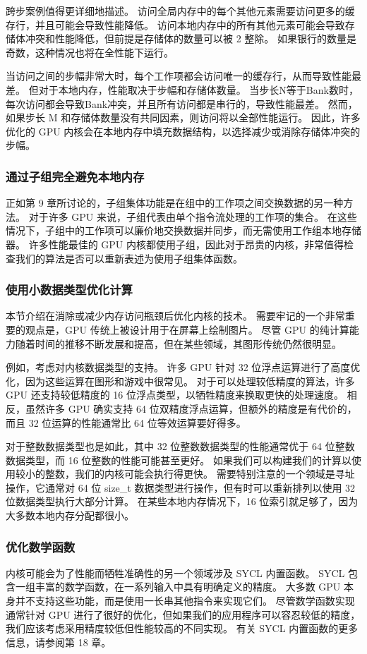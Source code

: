 跨步案例值得更详细地描述。 访问全局内存中的每个其他元素需要访问更多的缓存行，并且可能会导致性能降低。 访问本地内存中的所有其他元素可能会导致存储体冲突和性能降低，但前提是存储体的数量可以被 2 整除。 如果银行的数量是奇数，这种情况也将在全性能下运行。

当访问之间的步幅非常大时，每个工作项都会访问唯一的缓存行，从而导致性能最差。 但对于本地内存，性能取决于步幅和存储体数量。 当步长N等于Bank数时，每次访问都会导致Bank冲突，并且所有访问都是串行的，导致性能最差。 然而，如果步长 M 和存储体数量没有共同因素，则访问将以全部性能运行。 因此，许多优化的 GPU 内核会在本地内存中填充数据结构，以选择减少或消除存储体冲突的步幅。

\subsubsection{通过子组完全避免本地内存}
正如第 9 章所讨论的，子组集体功能是在组中的工作项之间交换数据的另一种方法。 对于许多 GPU 来说，子组代表由单个指令流处理的工作项的集合。 在这些情况下，子组中的工作项可以廉价地交换数据并同步，而无需使用工作组本地存储器。 许多性能最佳的 GPU 内核都使用子组，因此对于昂贵的内核，非常值得检查我们的算法是否可以重新表述为使用子组集体函数。

\subsubsection{使用小数据类型优化计算}
本节介绍在消除或减少内存访问瓶颈后优化内核的技术。 需要牢记的一个非常重要的观点是，GPU 传统上被设计用于在屏幕上绘制图片。 尽管 GPU 的纯计算能力随着时间的推移不断发展和提高，但在某些领域，其图形传统仍然很明显。

例如，考虑对内核数据类型的支持。 许多 GPU 针对 32 位浮点运算进行了高度优化，因为这些运算在图形和游戏中很常见。 对于可以处理较低精度的算法，许多 GPU 还支持较低精度的 16 位浮点类型，以牺牲精度来换取更快的处理速度。 相反，虽然许多 GPU 确实支持 64 位双精度浮点运算，但额外的精度是有代价的，而且 32 位运算的性能通常比 64 位等效运算要好得多。

对于整数数据类型也是如此，其中 32 位整数数据类型的性能通常优于 64 位整数数据类型，而 16 位整数的性能可能甚至更好。 如果我们可以构建我们的计算以使用较小的整数，我们的内核可能会执行得更快。 需要特别注意的一个领域是寻址操作，它通常对 64 位 size\_t 数据类型进行操作，但有时可以重新排列以使用 32 位数据类型执行大部分计算。 在某些本地内存情况下，16 位索引就足够了，因为大多数本地内存分配都很小。

\subsubsection{优化数学函数}
内核可能会为了性能而牺牲准确性的另一个领域涉及 SYCL 内置函数。 SYCL 包含一组丰富的数学函数，在一系列输入中具有明确定义的精度。 大多数 GPU 本身并不支持这些功能，而是使用一长串其他指令来实现它们。 尽管数学函数实现通常针对 GPU 进行了很好的优化，但如果我们的应用程序可以容忍较低的精度，我们应该考虑采用精度较低但性能较高的不同实现。 有关 SYCL 内置函数的更多信息，请参阅第 18 章。

